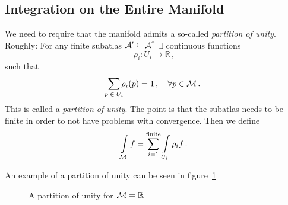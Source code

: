                 \subsection{Integration on the Entire Manifold}

                We need to require that the manifold admits a so-called \textit{partition of unity}.
                Roughly: For any finite subatlas $\mathcal{A}'\subseteq \mathcal{A}^\uparrow$
                $\exists$ continuous functions
                \begin{equation}
                    \rho_i: U_i \to \mathbb{R}\,,
                \end{equation}
                such that
                \begin{equation}
                    \sum\limits_{\mathclap{p\in U_i}} \rho_i(p) = 1\,,\quad\forall p\in \M\,.
                \end{equation}
                This is called a \textit{partition of unity}.
                The point is that the subatlas needs to be finite in order to not have problems
                with convergence.
                Then we define
                \begin{equation}
                    \int\limits_{\mathcal{M}} f = \sum\limits_{i=1}^{\text{finite}}\int\limits_{U_i}\rho_i f\,.
                \end{equation}

                An example of a partition of unity can be seen in figure~\ref{fig:partitionOfUnity}

                \begin{figure}[tbh]
                    \centering\def\svgwidth{\columnwidth}
                    
                    \caption{A partition of unity for $\mathcal{M} = \mathbb{R}$}
                    \label{fig:partitionOfUnity}
                \end{figure}

